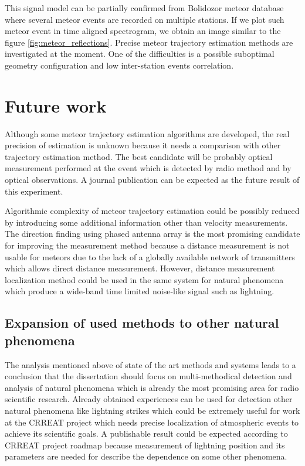 \documentclass[twoside]{ctuthesis}
\theoremstyle{plain}
\theoremstyle{definition}
\theoremstyle{note}
\begin{document}
This signal model can be partially confirmed from Bolidozor meteor database where several meteor events are recorded on multiple stations. If we plot such meteor event in time aligned spectrogram, we obtain an image similar to the figure \ref{fig:meteor_reflections}.
Precise meteor trajectory estimation methods are investigated at the moment.  One of the difficulties is a possible suboptimal geometry configuration and low inter-station events correlation.


\chapter{Future work}

Although some meteor trajectory estimation algorithms are developed, the real precision of estimation is unknown because it needs a comparison with other trajectory estimation method. The best candidate will be probably optical measurement performed at the event which is detected by radio method and by optical observations. A journal publication can be expected as the future result of this experiment. 

Algorithmic complexity of meteor trajectory estimation could be possibly reduced by introducing some additional information other than velocity measurements.  The direction finding using phased antenna array is the most promising candidate for improving the measurement method because a distance measurement is not usable for meteors due to the lack of a globally available network of transmitters which allows direct distance measurement.  However, distance measurement localization method could be used in the same system for natural phenomena which produce a wide-band time limited noise-like signal such as lightning.

\section{Expansion of used methods to other natural phenomena}

The analysis mentioned above of state of the art methods and systems leads to a conclusion that the dissertation should focus on multi-methodical detection and analysis of natural phenomena which is already the most promising area for radio scientific research. 
Already obtained experiences can be used for detection other natural phenomena like lightning strikes which could be extremely useful for work at the CRREAT project which needs precise localization of atmospheric events to achieve its scientific goals. A publishable result could be expected according to CRREAT project roadmap because measurement of lightning position and its parameters are needed for describe the dependence on some other phenomena.  
\end{document}
